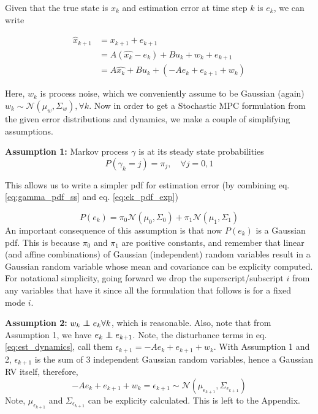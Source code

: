 \documentclass{article}[14pt]
\newcommand\independent{\protect\mathpalette{\protect\independenT}{\perp}}
\def\independenT#1#2{\mathrel{\rlap{$#1#2$}\mkern2mu{#1#2}}}
\begin{document}
	Given that the true state is $x_k$ and estimation error at time step $k$ is $e_k$, we can write

	\begin{subequations}
		\begin{align}
			\hat{x}_{k+1} &= x_{k+1} + e_{k+1} \nonumber \\
			       &= A(\hat{x_k}-e_k) + Bu_k + w_k + e_{k+1} \nonumber \\
	  &= A\hat{x_k}+ Bu_k + (-Ae_{k}+e_{k+1}+w_k)
			\label{eq:est_dynamics}
		\end{align}
	\end{subequations}

	Here, $w_k$ is process noise, which we conveniently assume to be Gaussian (again) $w_k\sim\mathcal{N}(\mu_w,\Sigma_w),\forall k$. Now in order to get a Stochastic MPC formulation from the given error distributions and dynamics, we make a couple of simplifying assumptions.

	\textbf{Assumption 1:} Markov process $\gamma$ is at its steady state probabilities
	\begin{equation}
		P(\gamma_k=j) =  \pi_j ,\quad \forall j=0,1
		\label{eq:gamma_pdf_ss}
	\end{equation}

	This allows us to write a simpler pdf for estimation error (by combining eq. \ref{eq:gamma_pdf_ss} and eq. \ref{eq:ek_pdf_exp})

	\begin{equation}
		P(e_k) = \pi_0\mathcal{N}(\mu_0,\Sigma_0) + \pi_1\mathcal{N}(\mu_1,\Sigma_1)
		\label{eq:ek_pdf_ss}
	\end{equation}
	An important consequence of this assumption is that now $P(e_k)$ is a Gaussian pdf. This is because $\pi_0$ and $\pi_1$ are positive constants, and remember that linear (and affine combinations) of Gaussian (independent) random variables result in a Gaussian random variable whose mean and covariance can be explicity computed. 
	For notational simplicity, going forward we drop the superscript/subscript $i$ from any variables that have it since all the formulation that follows is for a fixed mode $i$.


	\textbf{Assumption 2:} $w_k \independent e_k \forall{k}$, which is reasonable. Also, note that from Assumption 1, we have $e_k \independent e_{k+1}$.
	Note, the disturbance terms in eq. \ref{eq:est_dynamics}, call them $\epsilon_{k+1} = -Ae_{k}+e_{k+1}+w_k$. With Assumption 1 and 2, $\epsilon_{k+1}$ is the sum of 3 independent Gaussian random variables, hence a Gaussian RV itself, therefore,
	\begin{equation}
		-Ae_{k}+e_{k+1}+w_k = \epsilon_{k+1}  \sim \mathcal{N}(\mu_{\epsilon_{k+1}},\Sigma_{\epsilon_{k+1}})
		\label{eq:distr_pdf}
	\end{equation}
	Note, $\mu_{\epsilon_{k+1}}$ and $\Sigma_{\epsilon_{k+1}}$ can be explicity calculated. This is left to the Appendix.
\end{document}
